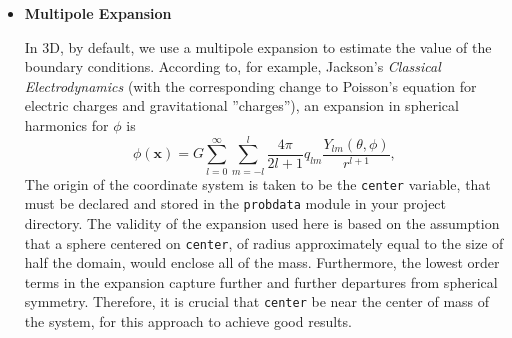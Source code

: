 
\begin{itemize}
\item \textbf{Multipole Expansion}

In 3D, by default, we use a multipole expansion to estimate the value of the boundary conditions. According to, for example, Jackson's \textit{Classical Electrodynamics} (with the corresponding change to Poisson's equation for electric charges and gravitational ''charges''), an expansion in spherical harmonics for $\phi$ is
\begin{equation}
  \phi(\mathbf{x}) = G\sum_{l=0}^{\infty}\sum_{m=-l}^{l} \frac{4\pi}{2l + 1} q_{lm} \frac{Y_{lm}(\theta,\phi)}{r^{l+1}}, \label{spherical_harmonic_expansion}
\end{equation}
The origin of the coordinate system is taken to be the \texttt{center} variable, that must be declared and stored in the \texttt{probdata} module in your project directory. The validity of the expansion used here is based on the assumption that a sphere centered on \texttt{center}, of radius approximately equal to the size of half the domain, would enclose all of the mass. Furthermore, the lowest order terms in the expansion capture further and further departures from spherical symmetry. Therefore, it is crucial that \texttt{center} be near the center of mass of the system, for this approach to achieve good results.


\end{itemize}
